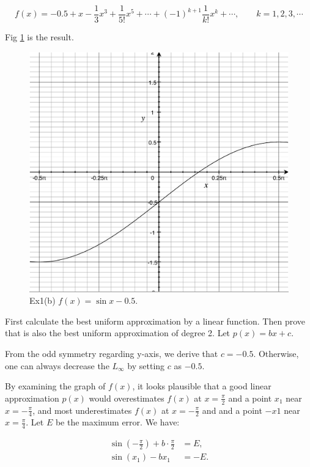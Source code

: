 \documentclass[
  course = {{16-811 Math Fundamentals for Robotics}},
  quartile = {{1}},
  assignment = 3,
  name = {{Kangle Deng}},
  email = {{kangled@andrew.cmu.edu}},
  firstexercise = 1
]{aga-homework}
\begin{document}
\exercise
\subexercise
\begin{equation*}
    f(x) = -0.5 + x - \frac{1}{3}x^3 + \frac{1}{5!}x^5 + \cdots + (-1)^{k+1}\frac{1}{k!}x^k + \cdots, \qquad k = 1,2,3,\cdots
\end{equation*}

\subexercise

Fig \ref{fig:hw3_ex1b} is the result.

\begin{figure}
    \centering
    \includegraphics[width = .6\textwidth]{math/fig/hw3/ex1b.pdf}
    \caption{Ex1(b) $f(x) = \sin x - 0.5$.}
    \label{fig:hw3_ex1b}
\end{figure}

\subexercise
First calculate the best uniform approximation by a linear function. Then prove that is also the best uniform approximation of degree 2. Let $p(x) = bx + c$.

From the odd symmetry regarding y-axis, we derive that $c = -0.5$. Otherwise, one can always decrease the $L_{\infty}$ by setting $c$ as $-0.5$.

By examining the graph of $f(x)$, it looks plausible that a good linear approximation $p(x)$ would overestimates $f(x)$ at $x = \frac{\pi}{2}$ and a point $x_1$ near $x = -\frac{\pi}{4}$, and most underestimates $f(x)$ at $x = -\frac{\pi}{2}$ and and a point $-x1$ near $x = \frac{\pi}{4}$. Let $E$ be the maximum error. We have:

\begin{equation*}
    \begin{aligned}
    \sin(-\frac{\pi}{2}) + b \cdot \frac{\pi}{2} & = E, \\
    \sin(x_1) - b x_1 & = -E.
    \end{aligned}
\end{equation*}
\end{document}
